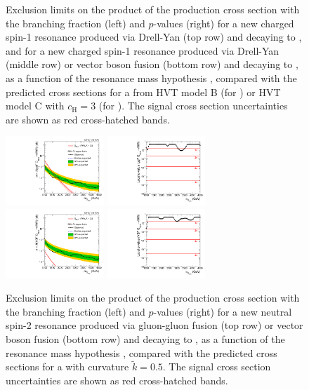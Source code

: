 \begin{figure}[htbp]
  \caption{
    Exclusion limits on the product of the production cross section with the branching fraction (left) and $p$-values (right) for a new charged spin-1 resonance produced via Drell-Yan (top row) and decaying to \WH, and for a new charged spin-1 resonance produced via Drell-Yan (middle row) or vector boson fusion (bottom row) and decaying to \WZ, as a function of the resonance mass hypothesis \MX, compared with the predicted cross sections for a \Wpr from HVT model B (for \DY) or HVT model C with $c_\mathrm{H}=3$ (for \VBF).
    The signal cross section uncertainties are shown as red cross-hatched bands.
  }
  \label{fig:limits_pvalue_spin1_char}
\end{figure}

\begin{figure}[htbp]
  \centering
  \includegraphics[width=0.33\textwidth]{fig/results/limits_GbuToWW.pdf}
  \includegraphics[width=0.33\textwidth]{fig/results/pvalue_GbuToWW.pdf}\\
  \includegraphics[width=0.33\textwidth]{fig/results/limits_VBFGbuToWW.pdf}
  \includegraphics[width=0.33\textwidth]{fig/results/pvalue_VBFGbuToWW.pdf}\\
  \caption{
    Exclusion limits on the product of the production cross section with the branching fraction (left) and $p$-values (right) for a new neutral spin-2 resonance produced via gluon-gluon fusion (top row) or vector boson fusion (bottom row) and decaying to \WW, as a function of the resonance mass hypothesis \MX, compared with the predicted cross sections for a \GBulk with curvature $\tilde{k}=0.5$.
    The signal cross section uncertainties are shown as red cross-hatched bands.
  }
  \label{fig:limits_pvalue_spin2}
\end{figure}
